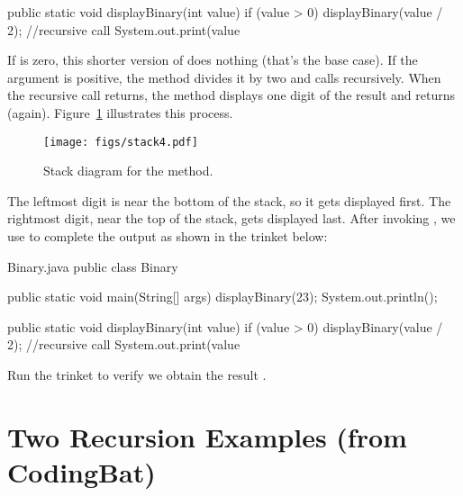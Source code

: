 \begin{code}
public static void displayBinary(int value) {
    if (value > 0) {
       displayBinary(value / 2); //recursive call
       System.out.print(value %
    }
}
\end{code}

If  is zero, this shorter version of  does nothing (that's the base case).
If the argument is positive, the method divides it by two and calls  recursively.
When the recursive call returns, the method displays one digit of the result and returns (again).
Figure~\ref{fig.stack4} illustrates this process.


\begin{figure}[!ht]
\begin{center}
\texttt{[image: figs/stack4.pdf]}
\caption{Stack diagram for the  method.}
\label{fig.stack4}
\end{center}
\end{figure}

The leftmost digit is near the bottom of the stack, so it gets displayed first.
The rightmost digit, near the top of the stack, gets displayed last.
After invoking , we use  to complete the output as shown in the trinket below:

\begin{trinket} [270] {Binary.java}
public class Binary {

    public static void main(String[] args) {
       displayBinary(23);
       System.out.println();
    }
    
    public static void displayBinary(int value) {
        if (value > 0) {
           displayBinary(value / 2); //recursive call
           System.out.print(value %
        }
    }
}
\end{trinket}

Run the trinket to verify we obtain the result .

\section{Two Recursion Examples (from CodingBat)}

